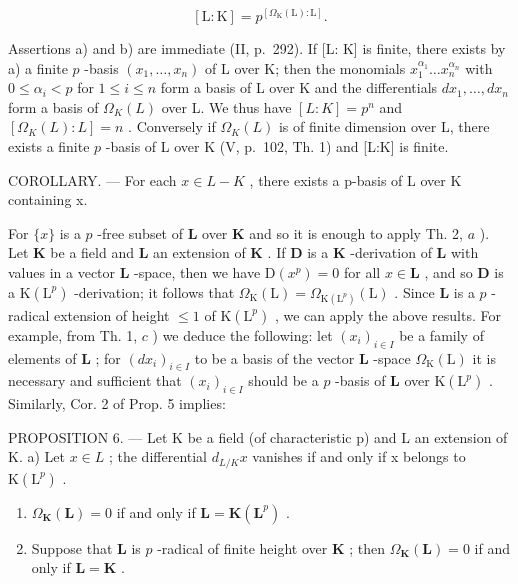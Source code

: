 \[
[ \mathrm{L}: \mathrm{K} ] = p ^ {[ \Omega_ {\mathrm{K}} (\mathrm{L}): \mathrm{L} ]}.\tag{5}
\]

Assertions a) and b) are immediate (II, p.~292). If {[}L: K{]} is finite, there exists by a) a finite \(p\) -basis \((x_1, \ldots, x_n)\) of L over K; then the monomials \(x_1^{\alpha_1} \ldots x_n^{\alpha_n}\) with \(0 \leqslant \alpha_i < p\) for \(1 \leqslant i \leqslant n\) form a basis of L over K and the differentials \(dx_1, \ldots, dx_n\) form a basis of \(\Omega_K(L)\) over L. We thus have \([L:K] = p^n\) and \([\Omega_K(L):L] = n\) . Conversely if \(\Omega_K(L)\) is of finite dimension over L, there exists a finite \(p\) -basis of L over K (V, p.~102, Th. 1) and {[}L:K{]} is finite.

COROLLARY. --- For each \(x \in L - K\) , there exists a p-basis of L over K containing x.

For \(\{x\}\) is a \(p\) -free subset of \(\mathbf{L}\) over \(\mathbf{K}\) and so it is enough to apply Th. 2, \(a\) ). Let \(\mathbf{K}\) be a field and \(\mathbf{L}\) an extension of \(\mathbf{K}\) . If \(\mathbf{D}\) is a \(\mathbf{K}\) -derivation of \(\mathbf{L}\) with values in a vector \(\mathbf{L}\) -space, then we have \(\mathrm{D}(x^p) = 0\) for all \(x \in \mathbf{L}\) , and so \(\mathbf{D}\) is a \(\mathrm{K}(\mathrm{L}^p)\) -derivation; it follows that \(\Omega_{\mathrm{K}}(\mathrm{L}) = \Omega_{\mathrm{K}(\mathrm{L}^p)}(\mathrm{L})\) . Since \(\mathbf{L}\) is a \(p\) -radical extension of height \(\leqslant 1\) of \(\mathrm{K}(\mathrm{L}^p)\) , we can apply the above results. For example, from Th. 1, \(c\) ) we deduce the following: let \((x_i)_{i \in I}\) be a family of elements of \(\mathbf{L}\) ; for \((dx_i)_{i \in I}\) to be a basis of the vector \(\mathbf{L}\) -space \(\Omega_{\mathrm{K}}(\mathrm{L})\) it is necessary and sufficient that \((x_i)_{i \in I}\) should be a \(p\) -basis of \(\mathbf{L}\) over \(\mathrm{K}(\mathrm{L}^p)\) . Similarly, Cor. 2 of Prop. 5 implies:

PROPOSITION 6. --- Let K be a field (of characteristic p) and L an extension of K. a) Let \(x \in L\) ; the differential \(d_{L/K}x\) vanishes if and only if x belongs to \(\mathrm{K}(\mathrm{L}^{p})\) .

\begin{enumerate}
\def\labelenumi{\alph{enumi})}
\setcounter{enumi}{1}
\item
  \(\Omega_{\mathbf{K}}(\mathbf{L}) = 0\) if and only if \(\mathbf{L} = \mathbf{K}(\mathbf{L}^p)\) .
\item
  Suppose that \(\mathbf{L}\) is \(p\) -radical of finite height over \(\mathbf{K}\) ; then \(\Omega_{\mathbf{K}}(\mathbf{L}) = 0\) if and only if \(\mathbf{L} = \mathbf{K}\) .
\end{enumerate}

